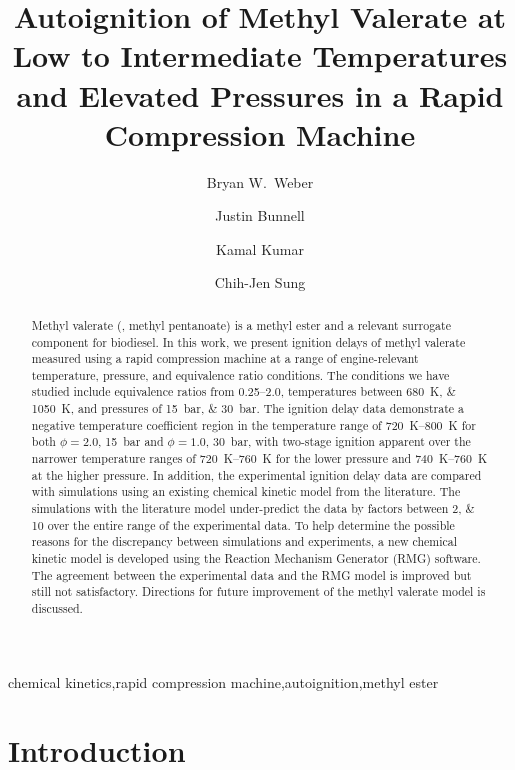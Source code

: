 \documentclass[12pt]{../ussci}
\title{ Autoignition of Methyl Valerate at Low to Intermediate Temperatures and Elevated Pressures in a Rapid Compression Machine }
\author[1*]{Bryan W.\ Weber}
\author[1]{Justin Bunnell}
\author[2]{Kamal Kumar}
\author[1]{Chih-Jen Sung}
\affil[1]{Department of Mechanical Engineering, University of Connecticut, Storrs, CT, USA}
\affil[2]{Department of Mechanical Engineering, University of Idaho, Moscow, ID, USA}
\affil[*]{Corresponding Author: \email{bryan.weber@uconn.edu}}
\begin{document}
\maketitle

\begin{abstract} %
    Methyl valerate (, methyl pentanoate) is a methyl ester and a
    relevant surrogate component for biodiesel. In this work, we present
    ignition delays of methyl valerate measured using a rapid compression
    machine at a range of engine-relevant temperature, pressure, and equivalence
    ratio conditions. The conditions we have studied include equivalence ratios
    from \numrange{0.25}{2.0}, temperatures between \SIlist{680;1050}{\K}, and
    pressures of \SIlist{15;30}{\bar}. The ignition delay data demonstrate a
    negative temperature coefficient region in the temperature range of
    \SIrange[range-phrase={--}]{720}{800}{\K} for both \(\phi=2.0\),
    \SI{15}{\bar} and \(\phi=1.0\), \SI{30}{\bar}, with two-stage ignition
    apparent over the narrower temperature ranges of
    \SIrange[range-phrase={--}]{720}{760}{\K} for the lower pressure and
    \SIrange[range-phrase={--}]{740}{760}{\K} at the higher pressure. In
    addition, the experimental ignition delay data are compared with simulations
    using an existing chemical kinetic model from the literature. The
    simulations with the literature model under-predict the data by factors
    between \numlist{2;10} over the entire range of the experimental data. To
    help determine the possible reasons for the discrepancy between simulations
    and experiments, a new chemical kinetic model is developed using the
    Reaction Mechanism Generator (RMG) software. The agreement between the
    experimental data and the RMG model is improved but still not satisfactory.
    Directions for future improvement of the methyl valerate model is
    discussed.
\end{abstract}

\begin{keyword}
    chemical kinetics\sep rapid compression machine\sep autoignition\sep methyl ester
\end{keyword}

\section{Introduction}\label{sec:introduction}
\end{document}
